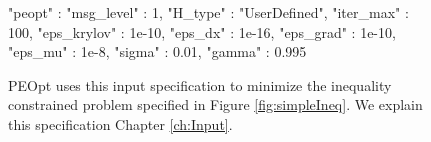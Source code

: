 \begin{figure}
    \begin{lstPeoptJSON}
{
   "peopt" : {
      "msg_level" : 1,
      "H_type" : "UserDefined",
      "iter_max" : 100,
      "eps_krylov" : 1e-10,
      "eps_dx" : 1e-16,
      "eps_grad" : 1e-10,
      "eps_mu" : 1e-8,
      "sigma" : 0.01,
      "gamma" : 0.995
   }
}
\end{lstPeoptJSON}
    \caption{PEOpt uses this input specification to minimize the inequality constrained problem specified in Figure \ref{fig:simpleIneq}.  We explain this specification Chapter \ref{ch:Input}.} 
    \label{fig:simpleIneqJSON}
\end{figure}
